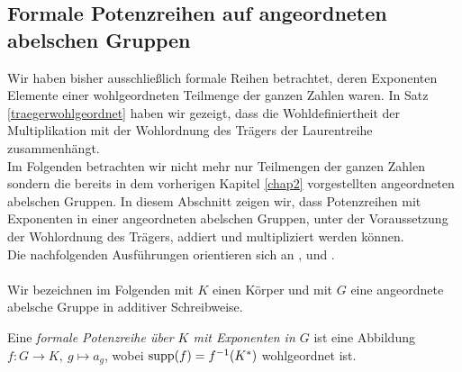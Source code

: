 \subsection{Formale Potenzreihen auf angeordneten abelschen Gruppen}
%
% 
%
%
%
%
Wir haben bisher ausschließlich formale Reihen betrachtet, deren Exponenten Elemente einer wohlgeordneten Teilmenge der ganzen Zahlen waren. In Satz \ref{traegerwohlgeordnet} haben wir gezeigt, dass die Wohldefiniertheit der Multiplikation mit der Wohlordnung des Trägers der Laurentreihe zusammenhängt. \\
Im Folgenden betrachten wir nicht mehr nur Teilmengen der ganzen Zahlen sondern die bereits in dem vorherigen Kapitel \ref{chap2} vorgestellten angeordneten abelschen Gruppen. In diesem Abschnitt zeigen wir, dass Potenzreihen mit Exponenten in einer angeordneten abelschen Gruppen, unter der Voraussetzung der Wohlordnung des Trägers, addiert und multipliziert werden können.\\  
  Die nachfolgenden Ausführungen orientieren sich an \cite[S. 194 - 199]{fuchs66}, \cite[S. 601 - 655]{hahn07} und \cite[S. 49 - 64]{priesscrampe83}.\\\\
Wir bezeichnen im Folgenden mit $K$ einen Körper und mit $G$ eine angeordnete abelsche Gruppe in additiver Schreibweise.
%
%
%
%
%
%
\begin{defn}\label{funktionsDefinitionFormalePotenzreihe}
Eine \textit{formale Potenzreihe über $K$ mit Exponenten in $G$} ist eine Abbildung $f\colon G \to K, ~g \mapsto a_g$, wobei $\textup{supp}(f) = f^{-1} (K^*)$ wohlgeordnet ist.
\end{defn}
%
%
%



